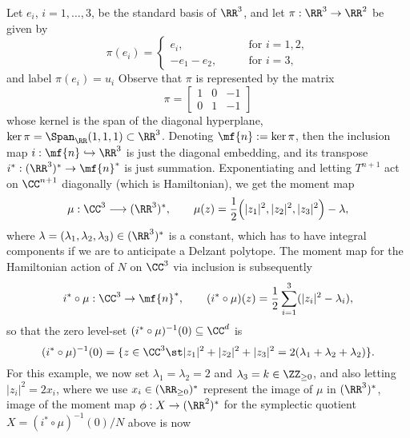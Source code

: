 Let $e_{i}$, $i = 1,\ldots,3$, be the standard basis of $\RR^{3}$, and let $\pi: \RR^{3} \rightarrow \RR^{2}$ be given by
\begin{equation*}
	\pi(e_{i}) =
	\begin{cases}
	e_{i},\qquad &\text{for } i=1,2,\\
	-e_{1}-e_{2},\qquad &\text{for } i=3,
	\end{cases}
\end{equation*}
and label $\pi(e_{i}) = u_{i}$ Observe that $\pi$ is represented by the matrix
\begin{equation*}
	\pi = \begin{bmatrix}
	1 & 0 & -1 \\
	0 & 1 & -1
	\end{bmatrix}
\end{equation*}
whose kernel is the span of the diagonal hyperplane, $\ker \pi = \Span_{\RR}(1, 1, 1) \subset \RR^{3}$. Denoting $\mf{n} := \ker\pi$, then the inclusion map $i :\mf{n} \hookrightarrow \RR^{3}$ is just the diagonal embedding, and its transpose $i^{\ast}:(\RR^{3})^{\ast} \rightarrow \mf{n}^{\ast}$ is just summation. Exponentiating and letting $T^{n+1}$ act on $\CC^{n+1}$ diagonally (which is Hamiltonian), we get the moment map
\begin{equation*}
	\mu:\CC^{3} \longrightarrow (\RR^{3})^{\ast},\qquad \mu(z) = \frac{1}{2}\Big(|z_{1}|^{2}, |z_{2}|^{2}, |z_{3}|^{2}   \Big) - \lambda,
\end{equation*}
where $\lambda = (\lambda_{1}, \lambda_{2}, \lambda_{3}) \in (\RR^{3})^{\ast}$ is a constant, which has to have integral components if we are to anticipate a Delzant polytope. The moment map for the Hamiltonian action of $N$ on $\CC^{3}$ via inclusion is subsequently
\begin{equation*}
	i^{\ast} \circ \mu:\CC^{3} \rightarrow \mf{n}^{\ast},\qquad (i^{\ast} \circ \mu)(z) = \frac{1}{2}\sum_{i=1}^{3}(|z_{i}|^{2} - \lambda_{i}),
\end{equation*}
so that the zero level-set $(i^{\ast} \circ \mu)^{-1}(0) \subseteq \CC^{d}$ is
\begin{equation*}
	(i^{\ast} \circ \mu)^{-1}(0) = \{z \in \CC^{3} \st |z_{1}|^{2} + |z_{2}|^{2} + |z_{3}|^{2} = 2(\lambda_{1} + \lambda_{2} + \lambda_{2}) \}.
\end{equation*}
For this example, we now set $\lambda_{1} = \lambda_{2} = 2$ and $\lambda_{3} = k\in \ZZ_{\geq 0}$, and also letting $|z_{i}|^{2} = 2x_{i}$, where we use $x_{i} \in (\RR_{\geq 0})^{\ast}$ represent the image of $\mu$ in $(\RR^{3})^{\ast}$, image of the moment map $\phi:X \rightarrow (\RR^{2})^{\ast}$ for the symplectic quotient $X = (i^{\ast} \circ \mu)^{-1}(0)/N$ above is now
